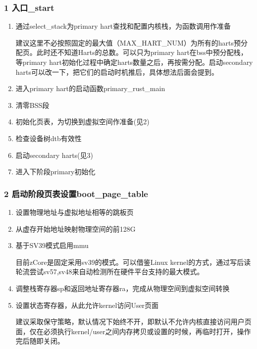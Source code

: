 \documentclass[
8pt, %
]{beamer}
\begin{document}
	\begin{frame}
		\frametitle{1 入口\_start}
		\begin{enumerate}
			\item 通过select\_stack为primary hart查找和配置内核栈，为函数调用作准备
			\begin{block}{}
			建议这里不必按照固定的最大值（MAX\_HART\_NUM）为所有的harts预分配页。此时还不知道Harts的总数。可以只为primary hart在bss中预分配栈，等primary hart初始化过程中确定harts数量之后，再按需分配。启动secondary harts可以改一下，把它们的启动时机推后，具体想法后面会提到。
			\end{block}
			\item 进入primary hart的启动函数primary\_rust\_main
			\item 清零BSS段
			\item 初始化页表，为切换到虚拟空间作准备(见2)
			\item 检查设备树dtb有效性
			\item 启动secondary harts(见3)
			\item 进入下阶段primary初始化
		\end{enumerate}
	\end{frame}

	\begin{frame}
		\frametitle{2 启动阶段页表设置boot\_page\_table}
		\begin{enumerate}
			\item 设置物理地址与虚拟地址相等的跳板页
			\item 从虚存开始地址映射物理空间的前128G
			\item 基于SV39模式启用mmu
			\begin{block}{}
				目前zCore是固定采用sv39的模式。可以借鉴Linux kernel的方式，通过写后读轮流尝试sv57,sv48来自动检测所在硬件平台支持的最大模式。
			\end{block}
			\item 调整栈寄存器sp和返回地址寄存器ra，完成从物理空间到虚拟空间转换
			\item 设置状态寄存器，从此允许kernel访问User页面
			\begin{block}{}
				建议采取保守策略，默认情况下始终不开，即默认不允许内核直接访问用户页面，仅在必须执行kernel/user之间内存拷贝或设置的时候，再临时打开，操作完后随即关闭。
			\end{block}
		\end{enumerate}
	\end{frame}
\end{document}
